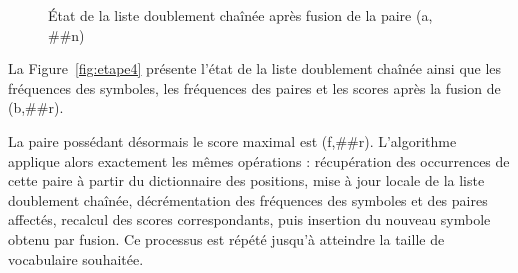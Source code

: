 \documentclass[12pt,a4paper]{report}
\begin{document}
\begin{figure}[ht]
{
	}
		\caption{État de la liste doublement chaînée après fusion de la paire (a, \#\#n)}
		\label{fig:etape3}
		
	\end{figure}
	
	La Figure~\ref{fig:etape4} présente l'état de la liste doublement chaînée ainsi que les fréquences des symboles, les fréquences des paires et les scores après la fusion de (b,\#\#r).
	
	La paire possédant désormais le score maximal est (f,\#\#r). L'algorithme applique alors exactement les mêmes opérations : récupération des occurrences de cette paire à partir du dictionnaire des positions, mise à jour locale de la liste doublement chaînée, décrémentation des fréquences des symboles et des paires affectés, recalcul des scores correspondants, puis insertion du nouveau symbole obtenu par fusion. Ce processus est répété jusqu'à atteindre la taille de vocabulaire souhaitée.
	
\end{document}
